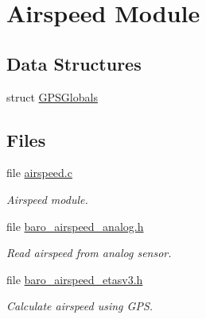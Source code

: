 \hypertarget{group___airspeed_module}{\section{\-Airspeed \-Module}
\label{group___airspeed_module}
}
\subsection*{\-Data \-Structures}
\begin{DoxyCompactItemize}
\item 
struct \hyperlink{struct_g_p_s_globals}{\-G\-P\-S\-Globals}
\end{DoxyCompactItemize}
\subsection*{\-Files}
\begin{DoxyCompactItemize}
\item 
file \hyperlink{airspeed_8c}{airspeed.\-c}
\begin{DoxyCompactList}\small\item\em \-Airspeed module. \end{DoxyCompactList}\item 
file \hyperlink{baro__airspeed__analog_8h}{baro\-\_\-airspeed\-\_\-analog.\-h}
\begin{DoxyCompactList}\small\item\em \-Read airspeed from analog sensor. \end{DoxyCompactList}\item 
file \hyperlink{baro__airspeed__etasv3_8h}{baro\-\_\-airspeed\-\_\-etasv3.\-h}
\begin{DoxyCompactList}\small\item\em \-Calculate airspeed using \-G\-P\-S. \end{DoxyCompactList}\end{DoxyCompactItemize}
